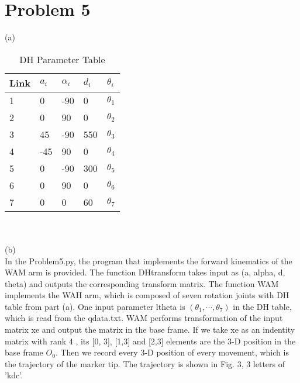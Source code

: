 \documentclass[twoside,11pt]{homework}
\begin{document}
\section*{Problem 5}
(a)\\
%
\begin{table}[h!] \centering
\caption{DH Parameter Table}
\begin{tabular}{|l|l|l|l|l|}
\hline
Link & $a_i$ & $\alpha_i$ & $d_i$ & $\theta_i$ \\ \hline
1             & 0             & -90               & 0    & $\theta_1$    \\ \hline
2             & 0             & 90                & 0    & $\theta_2$    \\ \hline
3             & 45            & -90               & 550  & $\theta_3$    \\ \hline
4             & -45           & 90                & 0    & $\theta_4$    \\ \hline
5             & 0             & -90               & 300  & $\theta_5$    \\ \hline
6             & 0             & 90                & 0    & $\theta_6$    \\ \hline
7             & 0             & 0                 & 60   & $\theta_7$    \\ \hline
\end{tabular}
\end{table}
\\\\
(b)\\
In the Problem5.py, the program that implements the forward kinematics of the WAM arm is provided.
The function DHtransform takes input as (a, alpha, d, theta) and outputs the corresponding transform matrix.
The function WAM implements the WAH arm, which is composed of seven rotation joints with DH table from part (a).
One input parameter ltheta is $(\theta_1, \cdots, \theta_7)$ in the DH table, which is read from the qdata.txt. 
WAM performs transformation of the input matrix xe and output the matrix in the base frame. 
If we take xe as an indentity matrix with rank 4 , its [0, 3], [1,3] and [2,3] elements are the 3-D position in the base frame $O_0$.
Then we record every 3-D position of every movement, which is the trajectory of the marker tip.
The trajectory is shown in Fig. 3, 3 letters of 'kdc'.
\end{document}
